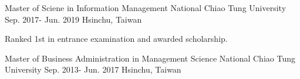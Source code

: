 

\begin{cventries}

  \cventry
    {Master of Sciene in Information Management} %
    {National Chiao Tung University} %
    {Sep. 2017- Jun. 2019} %
    {Hsinchu, Taiwan} %
    {
      \begin{cvitems} %
        \item {Ranked 1st in entrance examination and awarded scholarship.}
      \end{cvitems}
    }
\vspace{0.5em}

  \cventry
    {Master of Business Administration in Management Science} %
    {National Chiao Tung University} %
    {Sep. 2013- Jun. 2017} %
    {Hsinchu, Taiwan} %
    {
    }

\end{cventries}